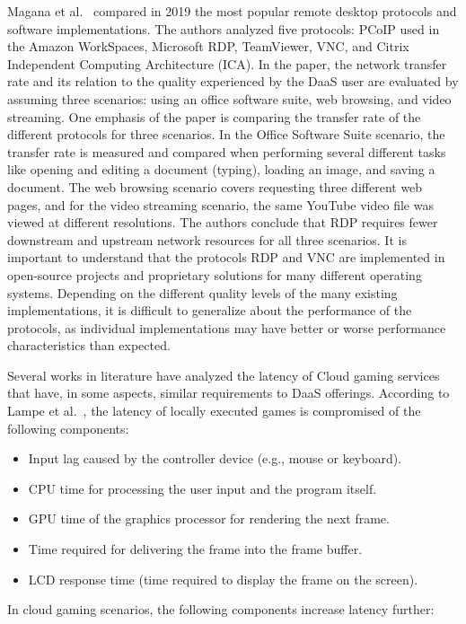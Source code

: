 \documentclass[runningheads]{llncs}
\begin{document}
Magana et al.~\cite{magana2019remote} compared in 2019 the most popular remote desktop protocols and software implementations. The authors analyzed five protocols: PCoIP used in the Amazon WorkSpaces, Microsoft RDP, TeamViewer, VNC, and Citrix Independent Computing Architecture (ICA). In the paper, the network transfer rate and its relation to the quality experienced by the DaaS user are evaluated by assuming three scenarios: using an office software suite, web browsing, and video streaming. One emphasis of the paper is comparing the transfer rate of the different protocols for three scenarios. In the Office Software Suite scenario, the transfer rate is measured and compared when performing several different tasks like opening and editing a document (typing), loading an image, and saving a document. The web browsing scenario covers requesting three different web pages, and for the video streaming scenario, the same YouTube video file was viewed at different resolutions. The authors conclude that RDP requires fewer downstream and upstream network resources for all three scenarios. It is important to understand that the protocols RDP and VNC are implemented in open-source projects and proprietary solutions for many different operating systems. Depending on the different quality levels of the many existing implementations, it is difficult to generalize about the performance of the protocols, as individual implementations may have better or worse performance characteristics than expected.

Several works in literature have analyzed the latency of Cloud gaming services that have, in some aspects, similar requirements to DaaS offerings. According to Lampe et al.~\cite{lampe2014assessing}, the latency of locally executed games is compromised of the following components:

\begin{itemize}
\item Input lag caused by the controller device (e.g., mouse or keyboard).
\item CPU time for processing the user input and the program itself.
\item GPU time of the graphics processor for rendering the next frame.
\item Time required for delivering the frame into the frame buffer.
\item LCD response time (time required to display the frame on the screen).
\end{itemize}

In cloud gaming scenarios, the following components increase latency further: 
\end{document}
